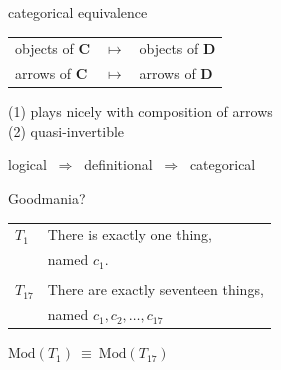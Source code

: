 \documentclass[17pt]{beamer}
\begin{document}
\def\3{\mathbf}


\begin{frame}{categorical equivalence}

\begin{tabular}{l l l}
objects of $\3C$  & $\longmapsto$ & objects of $\3D$  \\
arrows of $\3C$  & $\longmapsto$ & arrows of $\3D$ \end{tabular}

\bigskip (1) plays nicely with composition of arrows \\
(2) quasi-invertible 




\end{frame}

\begin{frame}

  \begin{center} logical $\:\Longrightarrow\:$ definitional
      $\:\Longrightarrow\:$ categorical 
\end{center}


\end{frame}



\begin{frame}{\small Goodmania?}

\begin{tabular}{l  l}

  $T_1$ & There is exactly one thing, \\ & named $c_1$. \\ \\ 
  $T_{17}$ & There are exactly seventeen things, \\ 
& named $c_1,c_2,\dots
  ,c_{17}$ \end{tabular}

\vspace{2em} \begin{center} \textcolor{red}{\danger} \quad $\mathrm{Mod}(T_1)\:\equiv\:
\mathrm{Mod}(T_{17})$ \quad \textcolor{red}{\danger} \end{center}




\end{frame}
\end{document}
